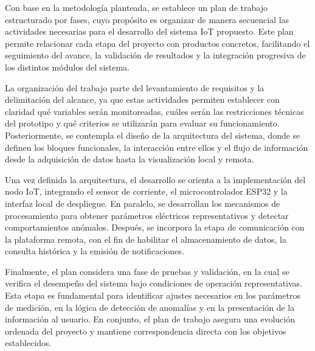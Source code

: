 ﻿\documentclass[12pt,openright,oneside]{report}
\theoremstyle{mytheoremstyle}
\theoremstyle{mytheoremstyle}
\theoremstyle{myproblemstyle}
\begin{document}
Con base en la metodología planteada, se establece un plan de trabajo estructurado por fases, cuyo propósito es organizar de manera secuencial las actividades necesarias para el desarrollo del sistema IoT propuesto. Este plan permite relacionar cada etapa del proyecto con productos concretos, facilitando el seguimiento del avance, la validación de resultados y la integración progresiva de los distintos módulos del sistema.

La organización del trabajo parte del levantamiento de requisitos y la delimitación del alcance, ya que estas actividades permiten establecer con claridad qué variables serán monitoreadas, cuáles serán las restricciones técnicas del prototipo y qué criterios se utilizarán para evaluar su funcionamiento. Posteriormente, se contempla el diseño de la arquitectura del sistema, donde se definen los bloques funcionales, la interacción entre ellos y el flujo de información desde la adquisición de datos hasta la visualización local y remota.

Una vez definida la arquitectura, el desarrollo se orienta a la implementación del nodo IoT, integrando el sensor de corriente, el microcontrolador ESP32 y la interfaz local de despliegue. En paralelo, se desarrollan los mecanismos de procesamiento para obtener parámetros eléctricos representativos y detectar comportamientos anómalos. Después, se incorpora la etapa de comunicación con la plataforma remota, con el fin de habilitar el almacenamiento de datos, la consulta histórica y la emisión de notificaciones.

Finalmente, el plan considera una fase de pruebas y validación, en la cual se verifica el desempeño del sistema bajo condiciones de operación representativas. Esta etapa es fundamental para identificar ajustes necesarios en los parámetros de medición, en la lógica de detección de anomalías y en la presentación de la información al usuario. En conjunto, el plan de trabajo asegura una evolución ordenada del proyecto y mantiene correspondencia directa con los objetivos establecidos.
\end{document}

